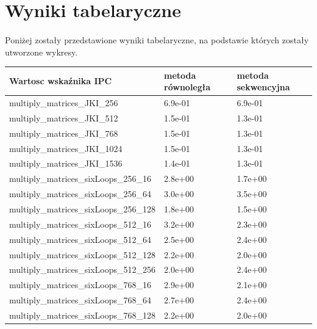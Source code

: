 \documentclass{scrartcl}
\begin{document}
\section{Wyniki tabelaryczne}
\paragraph{} Poniżej zostały przedstawione wyniki tabelaryczne, na podstawie których zostały utworzone wykresy.
\begin{table}[H]
\begin{tabular}{|l|l|l|}
\hline
Wartosc wskaźnika IPC         & metoda równoległa & metoda sekwencyjna \\ \hline
multiply\_matrices\_JKI\_256  & 6.9e-01           & 6.9e-01            \\ \hline
multiply\_matrices\_JKI\_512  & 1.5e-01           & 1.3e-01            \\ \hline
multiply\_matrices\_JKI\_768  & 1.5e-01           & 1.3e-01            \\ \hline
multiply\_matrices\_JKI\_1024 & 1.5e-01           & 1.3e-01            \\ \hline
multiply\_matrices\_JKI\_1536 & 1.4e-01           & 1.3e-01            \\ \hline
multiply\_matrices\_sixLoops\_256\_16   & 2.8e+00           & 1.7e+00            \\ \hline
multiply\_matrices\_sixLoops\_256\_64   & 3.0e+00           & 3.5e+00            \\ \hline
multiply\_matrices\_sixLoops\_256\_128  & 1.8e+00           & 1.5e+00            \\ \hline
multiply\_matrices\_sixLoops\_512\_16   & 3.2e+00           & 2.3e+00            \\ \hline
multiply\_matrices\_sixLoops\_512\_64   & 2.5e+00           & 2.4e+00            \\ \hline
multiply\_matrices\_sixLoops\_512\_128  & 2.2e+00           & 2.0e+00            \\ \hline
multiply\_matrices\_sixLoops\_512\_256  & 2.0e+00           & 2.4e+00            \\ \hline
multiply\_matrices\_sixLoops\_768\_16   & 2.9e+00           & 2.1e+00            \\ \hline
multiply\_matrices\_sixLoops\_768\_64   & 2.7e+00           & 2.4e+00            \\ \hline
multiply\_matrices\_sixLoops\_768\_128  & 2.2e+00           & 2.0e+00            \\ \hline

\end{tabular}
\end{table}
\end{document}
